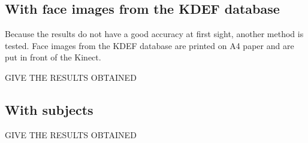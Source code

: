 \subsection{With face images from the KDEF database}

\vspace{\baselineskip}
\noindent Because the results do not have a good accuracy at first sight, another method is tested. Face images from the KDEF database are printed on A4 paper and are put in front of the Kinect.
\newline

\noindent GIVE THE RESULTS OBTAINED
\newline

\subsection{With subjects}

\vspace{\baselineskip}
\noindent GIVE THE RESULTS OBTAINED
\newline


